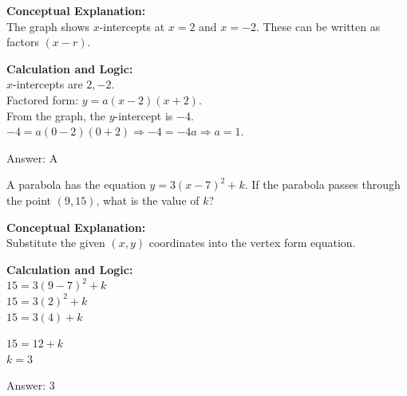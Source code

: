 \documentclass[11pt,paper=a4,answers]{exam}
\begin{document}
\begin{questions}
\begin{solution}
\textbf{Conceptual Explanation:} \\
The graph shows $x$-intercepts at $x=2$ and $x=-2$. These can be written as factors $(x-r)$.

\vspace{20pt}

\textbf{Calculation and Logic:} \\
$x$-intercepts are $2, -2$. \\
Factored form: $y = a(x-2)(x+2)$. \\
From the graph, the $y$-intercept is $-4$. \\
$-4 = a(0-2)(0+2) \Rightarrow -4 = -4a \Rightarrow a = 1$.

\vspace{25pt}

Answer: \colorbox{yellow!100}{A}
\end{solution}

\vspace{40pt}

\question
A parabola has the equation $y = 3(x-7)^2 + k$. If the parabola passes through the point $(9, 15)$, what is the value of $k$?

\begin{solution}
\textbf{Conceptual Explanation:} \\
Substitute the given $(x, y)$ coordinates into the vertex form equation.

\vspace{20pt}

\textbf{Calculation and Logic:} \\
$15 = 3(9-7)^2 + k$ \\
$15 = 3(2)^2 + k$ \\
$15 = 3(4) + k$

\vspace{10pt}

$15 = 12 + k$ \\
$k = 3$

\vspace{25pt}

Answer: \colorbox{yellow!100}{3}
\end{solution}

\vspace{40pt}


\end{questions}
\end{document}
